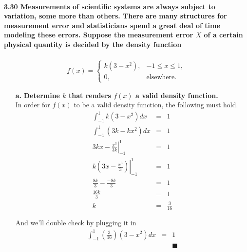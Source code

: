 \documentclass{article}
\begin{document}
\paragraph{3.30 Measurements of scientific systems are always subject to
variation, some more than others. There are many structures for measurement 
error and statisticians spend a great deal of time modeling these errors. 
Suppose the measurement error $X$ of a certain physical quantity is decided 
by the density function}
\begin{eqnarray*}
f(x) = \left\{ \begin{array}{ll}
	k(3-x^2), & -1 \leq x \leq 1,\\
	0, & \mbox{elsewhere.}
	\end{array} \right.
\end{eqnarray*}
\begin{enumerate}
\item[\textbf{a.}] \textbf{Determine $k$ that renders $f(x)$ a valid density
function.\\}
In order for $f(x)$ to be a valid density function, the following must hold.
\begin{eqnarray*}
\int_{-1}^1 k(3-x^2)dx & = & 1\\
\int_{-1}^1 (3k-kx^2)dx & = & 1\\
\left. 3kx - \frac{x^3}{3k} \right|_{-1}^{1} & = & 1\\
\left. k(3x - \frac{x^3}{3}) \right|_{-1}^{1} & = & 1\\
\frac{8k}{3} - \frac{-8k}{3} & = & 1\\
\frac{16k}{3} & = & 1\\
k & = & \frac{3}{16}
\end{eqnarray*}

And we'll double check by plugging it in
\begin{eqnarray*}
\int_{-1}^1 \left(\frac{3}{16}\right)(3-x^2)dx & = & 1\\
& &  \blacksquare
\end{eqnarray*}
\end{enumerate}

\pagebreak
\end{document}
